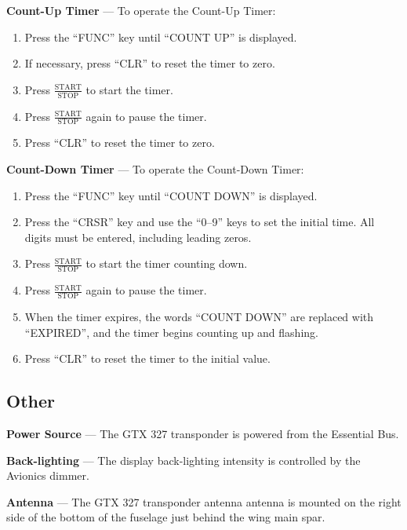 \textbf{Count-Up Timer} --- To operate the Count-Up Timer:
\begin{enumerate}
\item Press the ``FUNC'' key until ``COUNT UP'' is displayed.
\item If necessary, press ``CLR'' to reset the timer to zero.
\item Press $\mathrm{\frac{START}{STOP}}$ to start the timer.
\item Press $\mathrm{\frac{START}{STOP}}$ again to pause the timer.
\item Press ``CLR'' to reset the timer to zero.
\end{enumerate}

\textbf{Count-Down Timer} --- To operate the Count-Down Timer:
\begin{enumerate}
\item Press the ``FUNC'' key until ``COUNT DOWN'' is displayed.
\item Press the ``CRSR'' key and use the ``0--9'' keys to set the initial time. All digits must be entered, including leading zeros.
\item Press $\mathrm{\frac{START}{STOP}}$ to start the timer counting down.
\item Press $\mathrm{\frac{START}{STOP}}$ again to pause the timer.
\item When the timer expires, the words ``COUNT DOWN'' are replaced with ``EXPIRED'', and the timer begins counting up and flashing.
\item Press ``CLR'' to reset the timer to the initial value.
\end{enumerate}

\subsection*{Other}

\textbf{Power Source} --- The GTX 327 transponder is powered from the Essential Bus.

\textbf{Back-lighting} --- The display back-lighting intensity is controlled by the Avionics dimmer.

\textbf{Antenna} --- The GTX 327 transponder antenna antenna is mounted on the right side of the bottom of the fuselage just behind the wing main spar.

\FloatBarrier

%


\FloatBarrier

